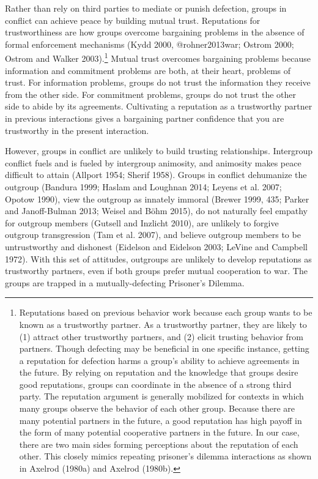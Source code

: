 \documentclass[11pt]{article}
\begin{document}
Rather than rely on third parties to mediate or punish defection, groups
in conflict can achieve peace by building mutual trust. Reputations for
trustworthiness are how groups overcome bargaining problems in the
absence of formal enforcement mechanisms (Kydd 2000, @rohner2013war;
Ostrom 2000; Ostrom and Walker 2003).\footnote{Reputations based on
  previous behavior work because each group wants to be known as a
  trustworthy partner. As a trustworthy partner, they are likely to (1)
  attract other trustworthy partners, and (2) elicit trusting behavior
  from partners. Though defecting may be beneficial in one specific
  instance, getting a reputation for defection harms a group's ability
  to achieve agreements in the future. By relying on reputation and the
  knowledge that groups desire good reputations, groups can coordinate
  in the absence of a strong third party. The reputation argument is
  generally mobilized for contexts in which many groups observe the
  behavior of each other group. Because there are many potential
  partners in the future, a good reputation has high payoff in the form
  of many potential cooperative partners in the future. In our case,
  there are two main sides forming perceptions about the reputation of
  each other. This closely mimics repeating prisoner's dilemma
  interactions as shown in Axelrod (1980a) and Axelrod (1980b).} Mutual
trust overcomes bargaining problems because information and commitment
problems are both, at their heart, problems of trust. For information
problems, groups do not trust the information they receive from the
other side. For commitment problems, groups do not trust the other side
to abide by its agreements. Cultivating a reputation as a trustworthy
partner in previous interactions gives a bargaining partner confidence
that you are trustworthy in the present interaction.

However, groups in conflict are unlikely to build trusting
relationships. Intergroup conflict fuels and is fueled by intergroup
animosity, and animosity makes peace difficult to attain (Allport 1954;
Sherif 1958). Groups in conflict dehumanize the outgroup (Bandura 1999;
Haslam and Loughnan 2014; Leyens et al. 2007; Opotow 1990), view the
outgroup as innately immoral (Brewer 1999, 435; Parker and Janoff-Bulman
2013; Weisel and Böhm 2015), do not naturally feel empathy for outgroup
members (Gutsell and Inzlicht 2010), are unlikely to forgive outgroup
transgression (Tam et al. 2007), and believe outgroup members to be
untrustworthy and dishonest (Eidelson and Eidelson 2003; LeVine and
Campbell 1972). With this set of attitudes, outgroups are unlikely to
develop reputations as trustworthy partners, even if both groups prefer
mutual cooperation to war. The groups are trapped in a
mutually-defecting Prisoner's Dilemma.
\end{document}
